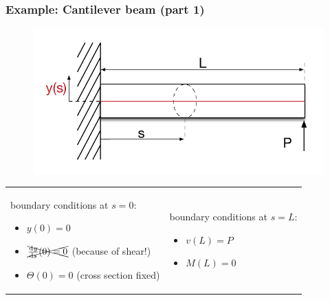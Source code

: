 \begin{frame}
  \frametitle{Example: Cantilever beam (part 1)}
  
  \begin{figure}
    \centering
    \includegraphics[width=16cm, keepaspectratio=true]{sections/traditional_beams/images/EulerCanitleverExample1part1}
  \end{figure}
  
  \begin{tabularx}{\linewidth}{XX}
    {
      boundary conditions at $s=0$:
      \begin{itemize}
        \item $y(0) = 0$
        \item $\xcancel{\od{y}{s}(0) = 0}$ (because of shear!)
        \item $\Theta(0) = 0$ (cross section fixed)
      \end{itemize}
    } & {
      boundary conditions at $s=L$:
      \begin{itemize}
        \item $v(L) = P$
        \item $M(L) = 0$
      \end{itemize}
    }
  \end{tabularx}
\end{frame}

